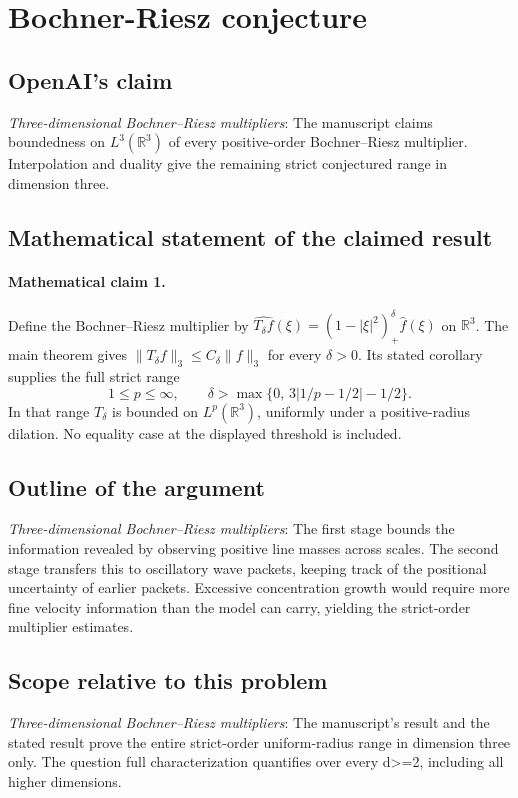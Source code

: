 \documentclass[11pt]{article}
\begin{document}
\section*{Bochner-Riesz conjecture}

\subsection{OpenAI's claim}
\textit{Three-dimensional Bochner--Riesz multipliers}: The manuscript claims boundedness on $L^3(\mathbb R^3)$ of every positive-order Bochner--Riesz multiplier. Interpolation and duality give the remaining strict conjectured range in dimension three.

\subsection{Mathematical statement of the claimed result}
\paragraph{Mathematical claim 1.} Define the Bochner--Riesz multiplier by $\widehat{T_\delta f}(\xi)=(1-|\xi|^2)_+^\delta\widehat f(\xi)$ on $\mathbb R^3$. The main theorem gives $\|T_\delta f\|_3\le C_\delta\|f\|_3$ for every $\delta>0$. Its stated corollary supplies the full strict range \[1\le p\le\infty,\qquad\delta>\max\{0,\,3|1/p-1/2|-1/2\}.\] In that range $T_\delta$ is bounded on $L^p(\mathbb R^3)$, uniformly under a positive-radius dilation. No equality case at the displayed threshold is included.

\subsection{Outline of the argument}
\textit{Three-dimensional Bochner--Riesz multipliers}: The first stage bounds the information revealed by observing positive line masses across scales. The second stage transfers this to oscillatory wave packets, keeping track of the positional uncertainty of earlier packets. Excessive concentration growth would require more fine velocity information than the model can carry, yielding the strict-order multiplier estimates.

\subsection{Scope relative to this problem}
\textit{Three-dimensional Bochner--Riesz multipliers}: The manuscript’s result and the stated result prove the entire strict-order uniform-radius range in dimension three only. The question full characterization quantifies over every d>=2, including all higher dimensions.
\end{document}
